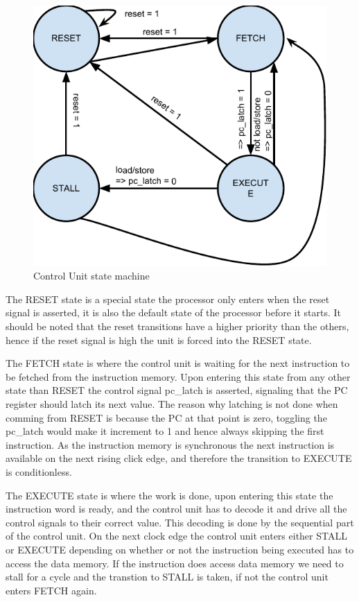 \begin{figure}[h]
    \centering\includegraphics[scale=0.8]{figures/control_unit_state_machine}
    \caption{Control Unit state machine}
    \label{figure:ctrl_unit_state_machine}    
\end{figure}

The RESET state is a special state the processor only enters when the reset signal is asserted, it is also the default state of the processor before it starts. It should be noted that the reset transitions have a higher priority than the others, hence if the reset signal is high the unit is forced into the RESET state.

The FETCH state is where the control unit is waiting for the next instruction to be fetched from the instruction memory. Upon entering this state from any other state than RESET the control signal pc\_latch is asserted, signaling that the PC register should latch its next value. The reason why latching is not done when comming from RESET is because the PC at that point is zero, toggling the pc\_latch would make it increment to 1 and hence always skipping the first instruction. As the instruction memory is synchronous the next instruction is available on the next rising click edge, and therefore the transition to EXECUTE is conditionless.

The EXECUTE state is where the work is done, upon entering this state the instruction word is ready, and the control unit has to decode it and drive all the control signals to their correct value. This decoding is done by the sequential part of the control unit. On the next clock edge the control unit enters either STALL or EXECUTE depending on whether or not the instruction being executed has to access the data memory. If the instruction does access data memory we need to stall for a cycle and the transtion to STALL is taken, if not the control unit enters FETCH again.

